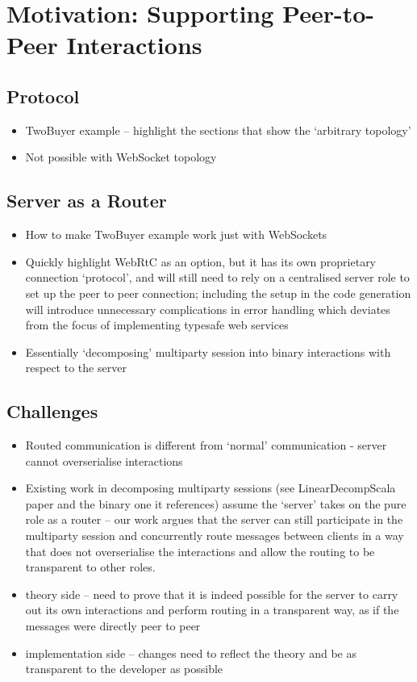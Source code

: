 \chapter{Motivation: Supporting Peer-to-Peer Interactions}

\section{ Protocol}
\begin{itemize}
\item TwoBuyer example -- highlight the sections that show the `arbitrary topology'
\item Not possible with WebSocket topology
\end{itemize}

\section{Server as a Router}
\begin{itemize}
\item How to make TwoBuyer example work just with WebSockets
\item Quickly highlight WebRtC as an option, but it has its own proprietary connection `protocol', and will still need to rely on a centralised server role to set up the peer to peer connection; including the setup in the code generation will introduce unnecessary complications in error handling which deviates from the focus of implementing typesafe web services
\item Essentially `decomposing' multiparty session into binary interactions with respect to the server
\end{itemize}

\section{Challenges}
\begin{itemize}
\item Routed communication is different from `normal' communication
- server cannot overserialise interactions
\item Existing work in decomposing multiparty sessions (see LinearDecompScala paper and the binary one it references) assume the `server' takes on the pure role as a router -- our work argues that the server can still participate in the multiparty session and concurrently route messages between clients in a way that does not overserialise the interactions and allow the routing to be transparent to other roles.
\item theory side -- need to prove that it is indeed possible for the server to carry out its own interactions and perform routing in a transparent way, as if the messages were directly peer to peer
\item implementation side -- changes need to reflect the theory and be as transparent to the developer as possible
\end{itemize}